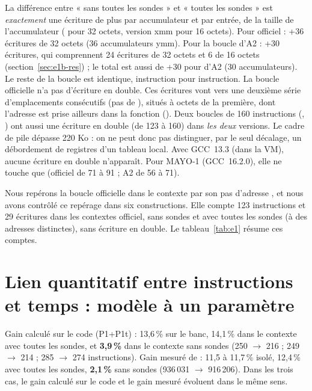 \F{} La différence entre « sans toutes les sondes » et « toutes les sondes » est \emph{exactement} une écriture de plus par accumulateur et par entrée, de la taille de l'accumulateur ( pour 32 octets, version xmm pour 16 octets). Pour  officiel : +36 écritures de 32 octets (36 accumulateurs ymm). Pour la boucle  d'A2 : +30 écritures, qui comprennent 24 écritures de 32 octets et 6 de 16 octets (section~\ref{sec:e1b-res}) ; le total est aussi de +30 pour  d'A2 (30 accumulateurs). Le reste de la boucle est identique, instruction pour instruction. La boucle officielle  n'a pas d'écriture en double. Ces écritures vont vers une deuxième série d'emplacements consécutifs (pas de ), situés à  octets de la première, dont l'adresse est prise ailleurs dans la fonction (). Deux boucles de 160 instructions (, ) ont aussi une écriture en double (de 123 à 160) dans \emph{les deux} versions. Le cadre de pile dépasse 220 Ko : on ne peut donc pas distinguer, par le seul décalage, un débordement de registres d'un tableau local. Avec GCC~13.3 (dans la VM), aucune écriture en double n'apparaît. Pour MAYO-1 (GCC~16.2.0), elle ne touche que  (officiel de 71 à 91 ; A2 de 56 à 71).

\F{} Nous repérons la boucle officielle  dans le contexte par son pas d'adresse , et nous avons contrôlé ce repérage dans six constructions. Elle compte 123 instructions et 29 écritures dans les contextes officiel, sans sondes et avec toutes les sondes (à des adresses distinctes), sans écriture en double. Le tableau~\ref{tab:e1} résume ces comptes.

\section[Instructions et temps]{Lien quantitatif entre instructions et temps : modèle à un paramètre}\label{sec:lien-quant}
\F{} Gain calculé sur le code (P1+P1t) : 13,6\,\% sur le banc, 14,1\,\% dans le contexte avec toutes les sondes, et \textbf{3,9\,\%} dans le contexte sans sondes (250 $\to$ 216 ; 249 $\to$ 214 ; 285 $\to$ 274 instructions). Gain mesuré de  : 11,5 à 11,7\,\% isolé, 12,4\,\% avec toutes les sondes, \textbf{2,1\,\%} sans sondes (936\,031 $\to$ 916\,206). Dans les trois cas, le gain calculé sur le code et le gain mesuré évoluent dans le même sens.

